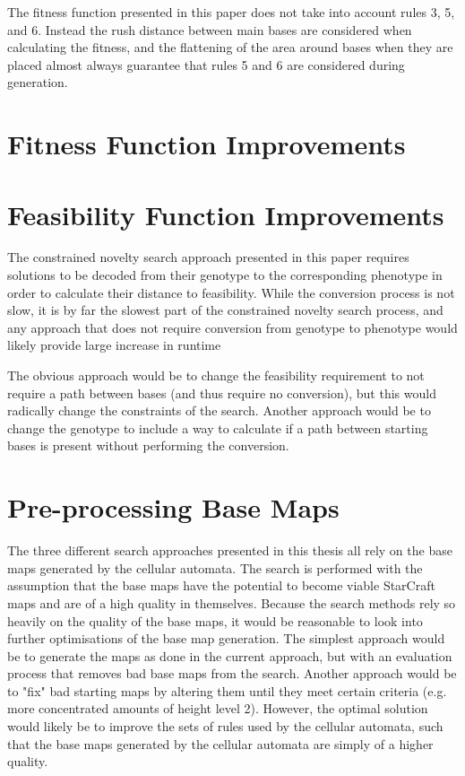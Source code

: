 The fitness function presented in this paper does not take into account rules 3, 5, and 6. Instead the rush distance between main bases are considered when calculating the fitness, and the flattening of the area around bases when they are placed almost always guarantee that rules 5 and 6 are considered during generation.

\section{Fitness Function Improvements}
\label{futurework_fitness}

\section{Feasibility Function Improvements}
\label{futurework_feasibility}
The constrained novelty search approach presented in this paper requires solutions to be decoded from their genotype to the corresponding phenotype in order to calculate their distance to feasibility. While the conversion process is not slow, it is by far the slowest part of the constrained novelty search process, and any approach that does not require conversion from genotype to phenotype would likely provide large increase in runtime 

The obvious approach would be to change the feasibility requirement to not require a path between bases (and thus require no conversion), but this would radically change the constraints of the search. Another approach would be to change the genotype to include a way to calculate if a path between starting bases is present without performing the conversion.
\section{Pre-processing Base Maps}
\label{futurework_preprocess}
The three different search approaches presented in this thesis all rely on the base maps generated by the cellular automata. The search is performed with the assumption that the base maps have the potential to become viable StarCraft maps and are of a high quality in themselves. Because the search methods rely so heavily on the quality of the base maps, it would be reasonable to look into further optimisations of the base map generation. The simplest approach would be to generate the maps as done in the current approach, but with an evaluation process that removes bad base maps from the search. Another approach would be to "fix" bad starting maps by altering them until they meet certain criteria (e.g. more concentrated amounts of height level 2). However, the optimal solution would likely be to improve the sets of rules used by the cellular automata, such that the base maps generated by the cellular automata are simply of a higher quality.